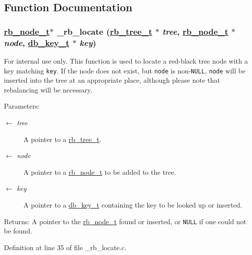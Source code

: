 \subsection{Function Documentation}
\hypertarget{group__dbprim__rbtree_ga14}{
\subsubsection[\_\-rb\_\-locate]{\setlength{\rightskip}{0pt plus 5cm}\hyperlink{struct__rb__node__s}{rb\_\-node\_\-t}$\ast$ \_\-rb\_\-locate (\hyperlink{struct__rb__tree__s}{rb\_\-tree\_\-t} $\ast$ {\em tree}, \hyperlink{struct__rb__node__s}{rb\_\-node\_\-t} $\ast$ {\em node}, \hyperlink{struct__db__key__s}{db\_\-key\_\-t} $\ast$ {\em key})}}
\label{group__dbprim__rbtree_ga14}


\begin{Desc}
\item[For internal use only.]
This function is used to locate a red-black tree node with a key matching {\tt key}. If the node does not exist, but {\tt node} is non-{\tt NULL}, {\tt node} will be inserted into the tree at an appropriate place, although please note that rebalancing will be necessary.

\begin{Desc}
\item[Parameters:]
\begin{description}
\item[\mbox{$\leftarrow$} {\em tree}]A pointer to a \hyperlink{group__dbprim__rbtree_ga0}{rb\_\-tree\_\-t}. \item[\mbox{$\leftarrow$} {\em node}]A pointer to a \hyperlink{group__dbprim__rbtree_ga1}{rb\_\-node\_\-t} to be added to the tree. \item[\mbox{$\leftarrow$} {\em key}]A pointer to a \hyperlink{group__dbprim_ga0}{db\_\-key\_\-t} containing the key to be looked up or inserted.\end{description}
\end{Desc}
\begin{Desc}
\item[Returns:]A pointer to the \hyperlink{group__dbprim__rbtree_ga1}{rb\_\-node\_\-t} found or inserted, or {\tt NULL} if one could not be found.\end{Desc}
\end{Desc}


Definition at line 35 of file \_\-rb\_\-locate.c.

